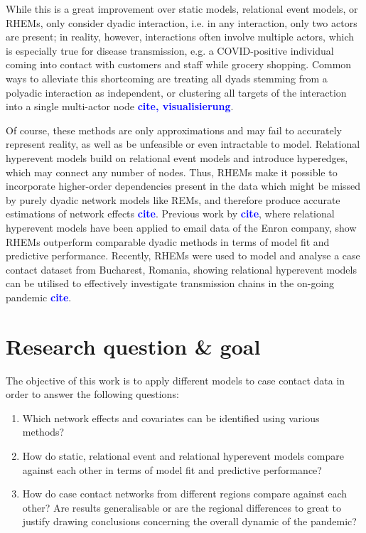 \documentclass{article}
\newcommand{\add}[1]{\textbf{\textcolor{blue}{#1}}}
\begin{document}
	While this is a great improvement over static models, relational event models, or RHEMs, only consider dyadic interaction, i.e. in any interaction, only two actors are present; in reality, however, interactions often involve multiple actors, which is especially true for disease transmission, e.g. a COVID-positive individual coming into contact with customers and staff while grocery shopping. Common ways to alleviate this shortcoming are treating all dyads stemming from a polyadic interaction as independent, or clustering all targets of the interaction into a single multi-actor node \add{cite, visualisierung}.
	
	Of course, these methods are only approximations and may fail to accurately represent reality, as well as be unfeasible or even intractable to model. Relational hyperevent models build on relational event models and introduce hyperedges, which may connect any number of nodes. Thus, RHEMs make it possible to incorporate higher-order dependencies present in the data which might be missed by purely dyadic network models like REMs, and therefore produce accurate estimations of network effects \add{cite}. Previous work by \add{cite}, where relational hyperevent models have been applied to email data of the Enron company, show RHEMs outperform comparable dyadic methods in terms of model fit and predictive performance. Recently, RHEMs were used to model and analyse a case contact dataset from Bucharest, Romania, showing relational hyperevent models can be utilised to effectively investigate transmission chains in the on-going pandemic \add{cite}.
	\section{Research question \& goal}
	The objective of this work is to apply different models to case contact data in order to answer the following questions:
	\begin{enumerate}
		\item Which network effects and covariates can be identified using various methods?
		\item How do static, relational event and relational hyperevent models compare against each other in terms of model fit and predictive performance?
		\item How do case contact networks from different regions compare against each other? Are results generalisable or are the regional differences to great to justify drawing conclusions concerning the overall dynamic of the pandemic?
	\end{enumerate}
	
\end{document}
